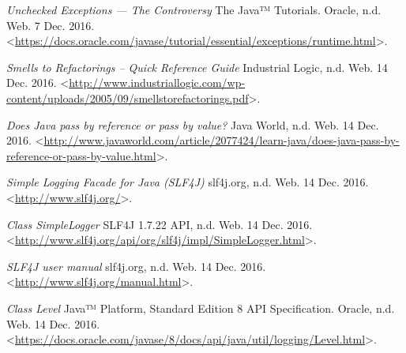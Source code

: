 \begin{thebibliography}{9}

\textit{Unchecked Exceptions — The Controversy} The Java™ Tutorials. Oracle, n.d. Web. 7 Dec. 2016. <\url{https://docs.oracle.com/javase/tutorial/essential/exceptions/runtime.html}>.



\textit{Smells to Refactorings -- Quick Reference Guide} Industrial Logic, n.d. Web. 14 Dec. 2016. <\url{http://www.industriallogic.com/wp-content/uploads/2005/09/smellstorefactorings.pdf}>.


\textit{Does Java pass by reference or pass by value?} Java World, n.d. Web. 14 Dec. 2016. <\url{http://www.javaworld.com/article/2077424/learn-java/does-java-pass-by-reference-or-pass-by-value.html}>.



\textit{Simple Logging Facade for Java (SLF4J)} slf4j.org, n.d. Web. 14 Dec. 2016. <\url{http://www.slf4j.org/}>.


\textit{Class SimpleLogger} SLF4J 1.7.22 API, n.d. Web. 14 Dec. 2016. <\url{http://www.slf4j.org/api/org/slf4j/impl/SimpleLogger.html}>.


\textit{SLF4J user manual} slf4j.org, n.d. Web. 14 Dec. 2016. <\url{http://www.slf4j.org/manual.html}>.


\textit{Class Level} Java™ Platform, Standard Edition 8
API Specification. Oracle, n.d. Web. 14 Dec. 2016. <\url{https://docs.oracle.com/javase/8/docs/api/java/util/logging/Level.html}>.

\end{thebibliography}
